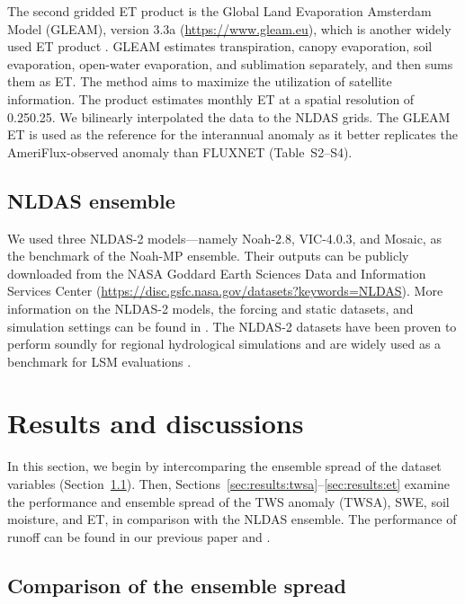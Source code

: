\documentclass[essd, manuscript]{copernicus}
\begin{document}
The second gridded ET product is the Global Land Evaporation Amsterdam Model (GLEAM), version 3.3a (\url{https://www.gleam.eu}), which is another widely used ET product \citep{xu2019JHa}. GLEAM estimates transpiration, canopy evaporation, soil evaporation, open-water evaporation, and sublimation separately, and then sums them as ET\@. The method aims to maximize the utilization of satellite information. The product estimates monthly ET at a spatial resolution of 0.25\degree{}\times{}0.25\degree{}. We bilinearly interpolated the data to the NLDAS grids. The GLEAM ET is used as the reference for the interannual anomaly as it better replicates the AmeriFlux-observed anomaly than FLUXNET (Table~S2--S4).

\subsection{NLDAS ensemble}\label{sec:methods:nldas}

We used three NLDAS-2 models---namely Noah-2.8, VIC-4.0.3, and Mosaic, as the benchmark of the Noah-MP ensemble. Their outputs can be publicly downloaded from the NASA Goddard Earth Sciences Data and Information Services Center (\url{https://disc.gsfc.nasa.gov/datasets?keywords=NLDAS}). More information on the NLDAS-2 models, the forcing and static datasets, and simulation settings can be found in \citet{xia2012JGRA, xia2012JGRAa}. The NLDAS-2 datasets have been proven to perform soundly for regional hydrological simulations \citep{xia2012JGRA, xia2012JGRAa, xia2016JGRA, xia2015JHa, xia2015JH} and are widely used as a benchmark for LSM evaluations \citep{cai2014JGRAa, fei2021WRR}.

\section{Results and discussions}\label{sec:results}

In this section, we begin by intercomparing the ensemble spread of the dataset variables (Section~\ref{sec:results:spread}). Then, Sections~\ref{sec:results:twsa}--\ref{sec:results:et} examine the performance and ensemble spread of the TWS anomaly (TWSA), SWE, soil moisture, and ET, in comparison with the NLDAS ensemble. The performance of runoff can be found in our previous paper \citet{fei2021WRR} and \citet{zheng2020JAMES}.

\subsection{Comparison of the ensemble spread}\label{sec:results:spread}
\end{document}

